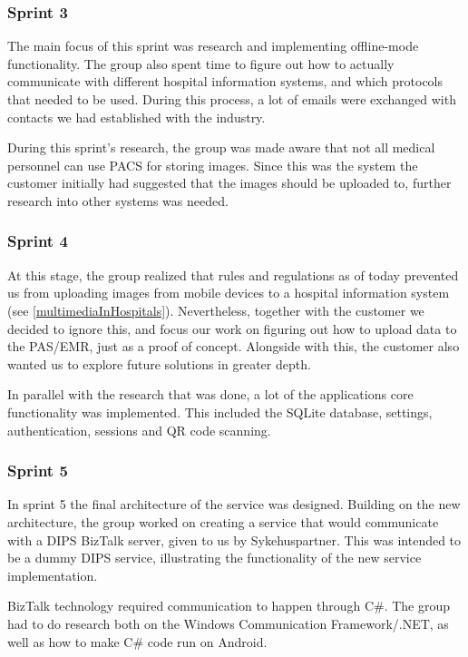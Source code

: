 \subsubsection{Sprint 3}
The main focus of this sprint was research and implementing offline-mode functionality. The group also spent time to figure out how to actually communicate with different hospital information systems, and which protocols that needed to be used. During this process, a lot of emails were exchanged with contacts we had established with the industry.

During this sprint's research, the group was made aware that not all medical personnel can use PACS for storing images. Since this was the system the customer initially had suggested that the images should be uploaded to, further research into other systems was needed.

\subsubsection{Sprint 4}
\label{sprint4}
At this stage, the group realized that rules and regulations as of today prevented us from uploading images from mobile devices to a hospital information system (see \ref{multimediaInHospitals}). Nevertheless, together with the customer we decided to ignore this, and focus our work on figuring out how to upload data to the PAS/EMR, just as a proof of concept. Alongside with this, the customer also wanted us to explore future solutions in greater depth.

In parallel with the research that was done, a lot of the applications core functionality was implemented. This included the SQLite database, settings, authentication, sessions and QR code scanning.   


\subsubsection{Sprint 5}
In sprint 5 the final architecture of the service was designed. Building on the new architecture, the group worked on creating a service that would communicate with a DIPS BizTalk server, given to us by Sykehuspartner. This was intended to be a dummy DIPS service, illustrating the functionality of the new service implementation.

BizTalk technology required communication to happen through C\#. The group had to do research both on the Windows Communication Framework/.NET, as well as how to make C\# code run on Android.

